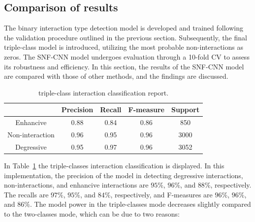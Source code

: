 \documentclass[unnumsec,webpdf,contemporary,large]{oup-authoring-template}%
\theoremstyle{thmstyleone}%
\theoremstyle{thmstyletwo}%
\theoremstyle{thmstylethree}%
\begin{document}
\subsection{Comparison of results}\label{subsec2}
The binary interaction type detection model is developed and trained following the validation procedure outlined in the previous section. Subsequently, the final triple-class model is introduced, utilizing the most probable non-interactions as zeros. The SNF-CNN model undergoes evaluation through a 10-fold CV to assess its robustness and efficiency. In this section, the results of the SNF-CNN model are compared with those of other methods, and the findings are discussed.
\begin{table}[t]
\begin{tabular}{|c|c|c|c|c|}
 \hline
         &Precision&Recall&F-measure&Support\\\hline
Enhancive&0.88&0.84&0.86&850\\
Non-interaction&0.96&0.95&0.96&3000\\
Degressive&0.95&0.97&0.96&3052\\
 \hline
\end{tabular}
\caption{triple-class interaction classification report.}
\label{tab5}
\end{table}
In Table~\ref{tab5} the triple-classes interaction classification is displayed. In this implementation, the precision of the model in detecting degressive interactions, non-interactions, and enhancive interactions are $95\%$, $96\%$, and $88\%$, respectively. The recalls are $97\%$, $95\%$, and $84\%$, respectively, and F-measures are $96\%$, $96\%$, and $86\%$. The model power in the triple-classes mode decreases slightly compared to the two-classes mode, which can be due to two reasons:
\end{document}
